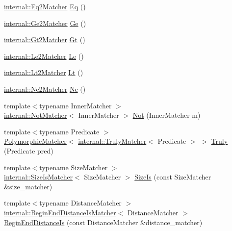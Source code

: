 \begin{DoxyCompactItemize}
\item 
\hyperlink{classtesting_1_1internal_1_1_eq2_matcher}{internal\+::\+Eq2\+Matcher} \hyperlink{namespacetesting_aa7771a34f092fd6f1dca2c82fb2a36a1}{Eq} ()
\item 
\hyperlink{classtesting_1_1internal_1_1_ge2_matcher}{internal\+::\+Ge2\+Matcher} \hyperlink{namespacetesting_a8cc0a6519e30bedf52c6e53c71e18265}{Ge} ()
\item 
\hyperlink{classtesting_1_1internal_1_1_gt2_matcher}{internal\+::\+Gt2\+Matcher} \hyperlink{namespacetesting_a3eaae6408f77ba7d87ca2d6a21dbde77}{Gt} ()
\item 
\hyperlink{classtesting_1_1internal_1_1_le2_matcher}{internal\+::\+Le2\+Matcher} \hyperlink{namespacetesting_a04def1c627ea7e3fce2f08cb06e83ebc}{Le} ()
\item 
\hyperlink{classtesting_1_1internal_1_1_lt2_matcher}{internal\+::\+Lt2\+Matcher} \hyperlink{namespacetesting_a3b4d6d29d715c1bf219163f5206b53d4}{Lt} ()
\item 
\hyperlink{classtesting_1_1internal_1_1_ne2_matcher}{internal\+::\+Ne2\+Matcher} \hyperlink{namespacetesting_a0cde8994764617eebc751e682c28d4ae}{Ne} ()
\item 
{\footnotesize template$<$typename Inner\+Matcher $>$ }\\\hyperlink{classtesting_1_1internal_1_1_not_matcher}{internal\+::\+Not\+Matcher}$<$ Inner\+Matcher $>$ \hyperlink{namespacetesting_a3d7d0dda7e51b13fe2f5aa28e23ed6b6}{Not} (Inner\+Matcher m)
\item 
{\footnotesize template$<$typename Predicate $>$ }\\\hyperlink{classtesting_1_1_polymorphic_matcher}{Polymorphic\+Matcher}$<$ \hyperlink{classtesting_1_1internal_1_1_truly_matcher}{internal\+::\+Truly\+Matcher}$<$ Predicate $>$ $>$ \hyperlink{namespacetesting_a5faf05cfaae6074439960048e478b1c8}{Truly} (Predicate pred)
\item 
{\footnotesize template$<$typename Size\+Matcher $>$ }\\\hyperlink{classtesting_1_1internal_1_1_size_is_matcher}{internal\+::\+Size\+Is\+Matcher}$<$ Size\+Matcher $>$ \hyperlink{namespacetesting_acd5e215558f95f1393c048a6d496060d}{Size\+Is} (const Size\+Matcher \&size\+\_\+matcher)
\item 
{\footnotesize template$<$typename Distance\+Matcher $>$ }\\\hyperlink{classtesting_1_1internal_1_1_begin_end_distance_is_matcher}{internal\+::\+Begin\+End\+Distance\+Is\+Matcher}$<$ Distance\+Matcher $>$ \hyperlink{namespacetesting_a122739b5b6bd9f993f26800dafdb4cc3}{Begin\+End\+Distance\+Is} (const Distance\+Matcher \&distance\+\_\+matcher)

\end{DoxyCompactItemize}
